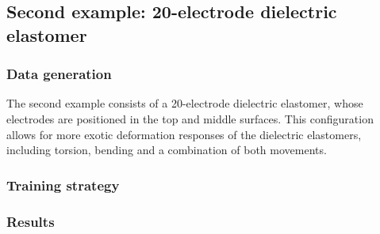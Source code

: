 \subsection{Second example: 20-electrode dielectric elastomer}

\subsubsection{Data generation}

The second example consists of a 20-electrode dielectric elastomer, whose electrodes are positioned in the top and middle surfaces. This configuration allows for more exotic deformation responses of the dielectric elastomers, including torsion, bending and a combination of both movements.


\subsubsection{Training strategy}
\subsubsection{Results}






